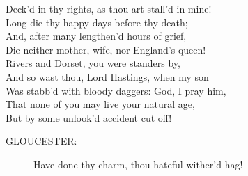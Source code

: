 \documentclass{article}
\begin{document}
\begin{description}
\hspace{1pt}Deck'd in thy rights, as thou art stall'd in mine!\\
\hspace{1pt}Long die thy happy days before thy death;\\
\hspace{1pt}And, after many lengthen'd hours of grief,\\
\hspace{1pt}Die neither mother, wife, nor England's queen!\\
\hspace{1pt}Rivers and Dorset, you were standers by,\\
\hspace{1pt}And so wast thou, Lord Hastings, when my son\\
\hspace{1pt}Was stabb'd with bloody daggers: God, I pray him,\\
\hspace{1pt}That none of you may live your natural age,\\
\hspace{1pt}But by some unlook'd accident cut off!\\
\end{description}
\begin{description}
\item[GLOUCESTER:] 
\hspace{1pt}Have done thy charm, thou hateful wither'd hag!\\
\end{description}
\end{document}

